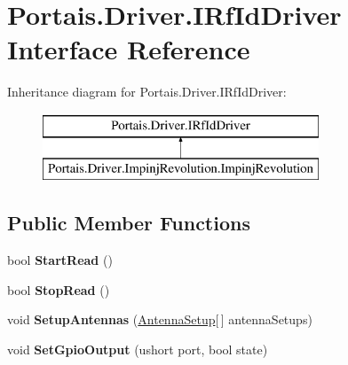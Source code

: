 \hypertarget{interface_portais_1_1_driver_1_1_i_rf_id_driver}{}\section{Portais.\+Driver.\+I\+Rf\+Id\+Driver Interface Reference}
\label{interface_portais_1_1_driver_1_1_i_rf_id_driver}
Inheritance diagram for Portais.\+Driver.\+I\+Rf\+Id\+Driver\+:\begin{figure}[H]
\begin{center}
\leavevmode
\includegraphics[height=2.000000cm]{interface_portais_1_1_driver_1_1_i_rf_id_driver}
\end{center}
\end{figure}
\subsection*{Public Member Functions}
\begin{DoxyCompactItemize}
\item 
bool {\bfseries Start\+Read} ()\hypertarget{interface_portais_1_1_driver_1_1_i_rf_id_driver_af54ea2726012a33f476db4f4f49acce7}{}\label{interface_portais_1_1_driver_1_1_i_rf_id_driver_af54ea2726012a33f476db4f4f49acce7}

\item 
bool {\bfseries Stop\+Read} ()\hypertarget{interface_portais_1_1_driver_1_1_i_rf_id_driver_af9a7fe93d3bb1813271baef5e09822c9}{}\label{interface_portais_1_1_driver_1_1_i_rf_id_driver_af9a7fe93d3bb1813271baef5e09822c9}

\item 
void {\bfseries Setup\+Antennas} (\hyperlink{class_portais_1_1_driver_1_1_antenna_setup}{Antenna\+Setup}\mbox{[}$\,$\mbox{]} antenna\+Setups)\hypertarget{interface_portais_1_1_driver_1_1_i_rf_id_driver_a03a2106272e57d68c8dd32056d2d7142}{}\label{interface_portais_1_1_driver_1_1_i_rf_id_driver_a03a2106272e57d68c8dd32056d2d7142}

\item 
void {\bfseries Set\+Gpio\+Output} (ushort port, bool state)\hypertarget{interface_portais_1_1_driver_1_1_i_rf_id_driver_af44dac3eb2bbd802998948840a72c466}{}\label{interface_portais_1_1_driver_1_1_i_rf_id_driver_af44dac3eb2bbd802998948840a72c466}

\end{DoxyCompactItemize}
